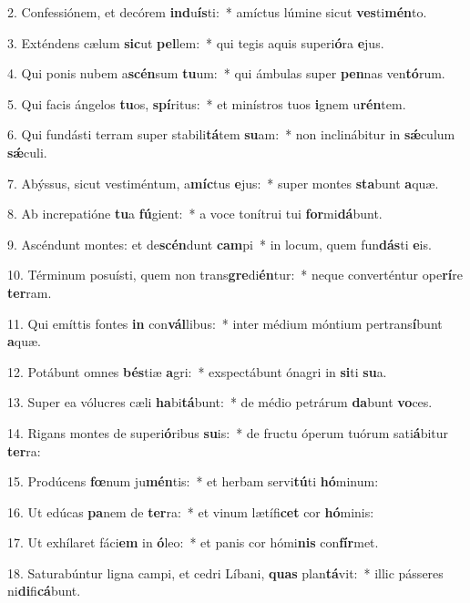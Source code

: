 2. Confessiónem, et decórem \textbf{ind}u\textbf{ís}ti:~*  amíctus lúmine sicut \textbf{ves}ti\textbf{mén}to.\

3. Exténdens cælum \textbf{sic}ut \textbf{pel}lem:~*  qui tegis aquis superi\textbf{ó}ra \textbf{e}jus.\

4. Qui ponis nubem a\textbf{scén}sum \textbf{tu}um:~*  qui ámbulas super \textbf{pen}nas ven\textbf{tó}rum.\

5. Qui facis ángelos \textbf{tu}os, \textbf{spí}ritus:~*  et minístros tuos \textbf{i}gnem u\textbf{rén}tem.\

6. Qui fundásti terram super stabili\textbf{tá}tem \textbf{su}am:~*  non inclinábitur in \textbf{sǽ}culum \textbf{sǽ}culi.\

7. Abýssus, sicut vestiméntum, a\textbf{míc}tus \textbf{e}jus:~*  super montes \textbf{sta}bunt \textbf{a}quæ.\

8. Ab increpatióne \textbf{tu}a \textbf{fú}gient:~*  a voce tonítrui tui \textbf{for}mi\textbf{dá}bunt.\

9. Ascéndunt montes: et de\textbf{scén}dunt \textbf{cam}pi~*  in locum, quem fun\textbf{dás}ti \textbf{e}is.\

10. Términum posuísti, quem non trans\textbf{gre}di\textbf{én}tur:~*  neque converténtur ope\textbf{rí}re \textbf{ter}ram.\

11. Qui emíttis fontes \textbf{in} con\textbf{vál}libus:~*  inter médium móntium pertrans\textbf{í}bunt \textbf{a}quæ.\

12. Potábunt omnes \textbf{bés}tiæ \textbf{a}gri:~*  exspectábunt ónagri in \textbf{si}ti \textbf{su}a.\

13. Super ea vólucres cæli \textbf{ha}bi\textbf{tá}bunt:~*  de médio petrárum \textbf{da}bunt \textbf{vo}ces.\

14. Rigans montes de superi\textbf{ó}ribus \textbf{su}is:~*  de fructu óperum tuórum sati\textbf{á}bitur \textbf{ter}ra:\

15. Prodúcens \textbf{fœ}num ju\textbf{mén}tis:~*  et herbam servi\textbf{tú}ti \textbf{hó}minum:\

16. Ut edúcas \textbf{pa}nem de \textbf{ter}ra:~*  et vinum lætífi\textbf{cet} cor \textbf{hó}minis:\

17. Ut exhílaret fáci\textbf{em} in \textbf{ó}leo:~*  et panis cor hómi\textbf{nis} con\textbf{fír}met.\

18. Saturabúntur ligna campi, et cedri Líbani, \textbf{quas} plan\textbf{tá}vit:~*  illic pásseres ni\textbf{di}fi\textbf{cá}bunt.\

